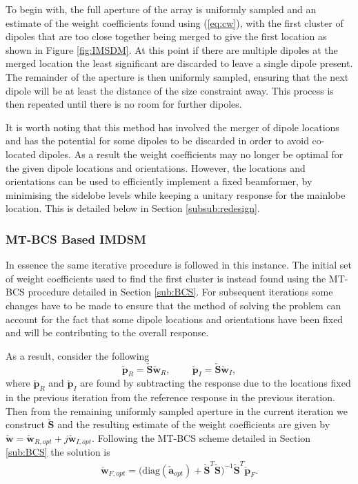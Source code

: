 \documentclass[10pt,final]{IEEEtran}
\begin{document}
To begin with, the full aperture of the array is uniformly sampled and an estimate of the weight coefficients found using (\ref{eq:cw}), with the first cluster of dipoles that are too close together being merged to give the first location as shown in Figure \ref{fig:IMSDM}.  At this point if there are multiple dipoles at the merged location the least significant are discarded to leave a single dipole present.  The remainder of the aperture is then uniformly sampled, ensuring that the next dipole will be at least the distance of the size constraint away.  This process is then repeated until there is no room for further dipoles.

It is worth noting that this method has involved the merger of dipole locations and has the potential for some dipoles to be discarded in order to avoid co-located dipoles.  As a result the weight coefficients may no longer be optimal for the given dipole locations and orientations. However, the locations and orientations can be used to efficiently implement a fixed beamformer, by minimising the sidelobe levels while keeping a unitary response for the mainlobe location.  This is detailed below in Section \ref{subsub:redesign}.


\subsubsection{MT-BCS Based IMDSM}
In essence the same iterative procedure is followed in this instance.  The initial set of weight coefficients used to find the first cluster is instead found using the MT-BCS procedure detailed in Section \ref{sub:BCS}.  For subsequent iterations some changes have to be made to ensure that the method of solving the problem can account for the fact that some dipole locations and orientations have been fixed and will be contributing to the overall response.

As a result, consider the following
\begin{equation}\label{eq:bcsimdsm1}
  \check{\textbf{p}}_{R}= \check{\textbf{S}}\check{\textbf{w}}_{R},\;\;\;\;\;\;\;\; \check{\textbf{p}}_{I}= \check{\textbf{S}}\check{\textbf{w}}_{I},
\end{equation}
where $\check{\textbf{p}}_{R}$ and $\check{\textbf{p}}_{I}$ are found by subtracting the response due to the locations fixed in the previous iteration from the reference response in the previous iteration.  Then from the remaining uniformly sampled aperture in the current iteration we construct $\check{\textbf{S}}$ and the resulting estimate of the weight coefficients are given by $\check{\textbf{w}}=\check{\textbf{w}}_{R,opt}+j\check{\textbf{w}}_{I,opt}$.  Following the MT-BCS scheme detailed in Section \ref{sub:BCS} the solution is
\begin{eqnarray}\label{eq:bcsimdsm2}
  \check{\textbf{w}}_{F,opt} = \bigg(\text{diag}(\check{\textbf{a}}_{opt})+\check{\textbf{S}}^{T}\check{\textbf{S}} \bigg)^{-1}\check{\textbf{S}}^{T}\check{\textbf{p}}_{F}.
\end{eqnarray}
\end{document}
